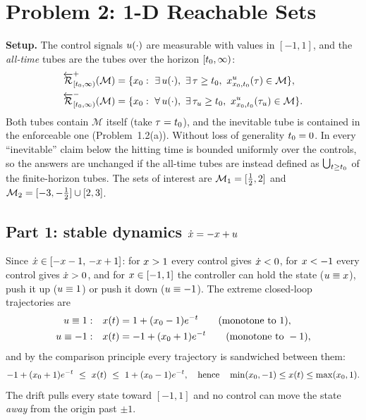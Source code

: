 
\section*{Problem 2: 1-D Reachable Sets}

\noindent\textbf{Setup.}
The control signals ${u}(\cdot)$ are measurable with values in $[-1,1]$, and the \emph{all-time}
tubes are the tubes over the horizon $[{t}_0,\infty)$:
\begin{align*}
\eBRTinf{\mathcal M}&=\{\state_0:\ \exists\,\ctrl(\cdot),\ \exists\,\taux\ge\tvar_0,\ \trju{\ctrl}{\taux}\in\mathcal M\},\\
\iBRTinf{\mathcal M}&=\{\state_0:\ \forall\,\ctrl(\cdot),\ \exists\,\taux_{\ctrl}\ge\tvar_0,\ \trju{\ctrl}{\taux_{\ctrl}}\in\mathcal M\}.
\end{align*}
Both tubes contain $\mathcal M$ itself (take ${\tau}={t}_0$), and the inevitable tube is contained
in the enforceable one (Problem~1.2(a)). Without loss of generality ${t}_0=0$. In every
``inevitable'' claim below the hitting time is bounded uniformly over the controls, so the answers
are unchanged if the all-time tubes are instead defined as $\bigcup_{{t}\ge{t}_0}$ of the
finite-horizon tubes. The sets of interest are
$\mathcal{M}_1=[\tfrac12,2]$ and $\mathcal{M}_2=[-3,-\tfrac12]\cup[2,3]$.

\subsection*{Part 1: stable dynamics $\dot{{x}}=-{x}+{u}$}

Since $\dot{{x}}\in[-{x}-1,\,-{x}+1]$: for ${x}>1$ every control gives $\dot{{x}}<0$, for
${x}<-1$ every control gives $\dot{{x}}>0$, and for ${x}\in[-1,1]$ the controller can hold the
state (${u}\equiv{x}$), push it up (${u}\equiv1$) or push it down (${u}\equiv-1$). The
extreme closed-loop trajectories are
\begin{align*}
{u}\equiv1:&\quad {x}({t})=1+({x}_0-1)e^{-{t}}\qquad(\text{monotone to }1),\\
{u}\equiv-1:&\quad {x}({t})=-1+({x}_0+1)e^{-{t}}\qquad(\text{monotone to }-1),
\end{align*}
and by the comparison principle every trajectory is sandwiched between them:
\begin{equation}\label{eq:stable-bounds}
-1+(\state_0+1)e^{-\tvar}\ \le\ \state(\tvar)\ \le\ 1+(\state_0-1)e^{-\tvar},
\quad\text{hence}\quad
\min(\state_0,-1)\le\state(\tvar)\le\max(\state_0,1).
\end{equation}
The drift pulls every state toward $[-1,1]$ and no control can move the state \emph{away} from the
origin past $\pm1$.

